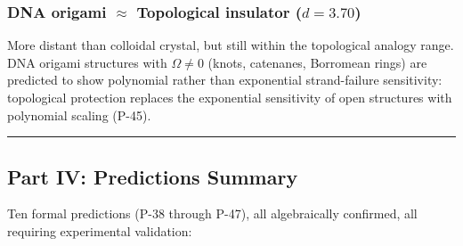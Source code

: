 \documentclass[12pt,a4paper]{article}
\begin{document}
\subsubsection{DNA origami $\approx$ Topological insulator ($d = 3.70$)}

More distant than colloidal crystal, but still within the topological analogy range. DNA origami structures with $\Omega \neq 0$ (knots, catenanes, Borromean rings) are predicted to show polynomial rather than exponential strand-failure sensitivity: topological protection replaces the exponential sensitivity of open structures with polynomial scaling (P-45).

\begin{center}
\rule{0.5\textwidth}{0.4pt}
\end{center}

\subsection{Part IV: Predictions Summary}

Ten formal predictions (P-38 through P-47), all algebraically confirmed, all requiring experimental validation:
\end{document}
